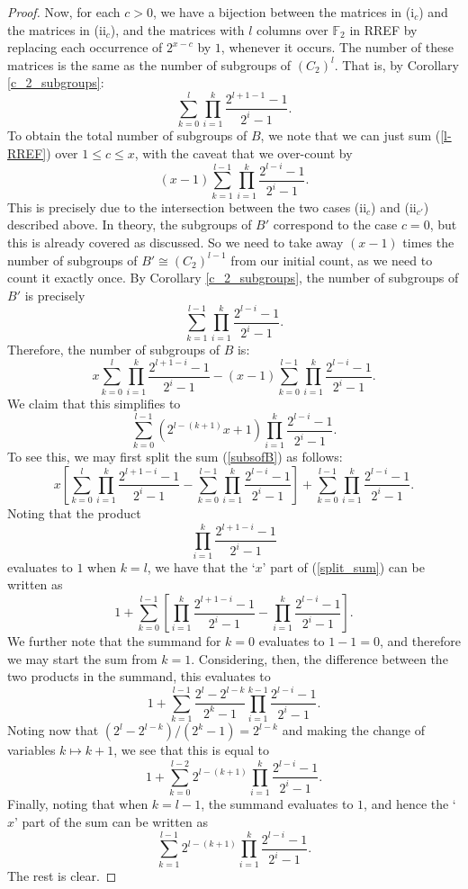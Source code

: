 \documentclass[10pt,a4paper]{amsart}
\begin{document}
\begin{proof}
    Now, for each $c>0$, we have a bijection between the matrices in (i$_c$) and the matrices in (ii$_c$), and the matrices with $l$ columns over $\mathbb{F}_2$ in RREF by replacing each occurrence of $2^{x-c}$ by $1$, whenever it occurs. The number of these matrices is the same as the number of subgroups of $(C_2)^l$. That is, by Corollary \ref{c_2_subgroups}:
    \begin{equation}\label{l-RREF}
        \sum_{k=0}^l\prod_{i=1}^k\frac{2^{l+1-1}-1}{2^i-1}.
    \end{equation}
    To obtain the total number of subgroups of $B$, we note that we can just sum (\ref{l-RREF}) over $1 \leq c \leq x$, with the caveat that we over-count by
    \[(x-1)\sum_{k=1}^{l-1}\prod_{i=1}^k\frac{2^{l-i}-1}{2^i-1}.\]
    This is precisely due to the intersection between the two cases (ii$_c$) and (ii$_{c'}$) described above. In theory, the subgroups of $B'$ correspond to the case $c=0$, but this is already covered as discussed. So we need to take away $(x-1)$ times the number of subgroups of $B' \cong (C_2)^{l-1}$ from our initial count, as we need to count it exactly once. By Corollary \ref{c_2_subgroups}, the number of subgroups of $B'$ is precisely
    \[\sum_{k=1}^{l-1}\prod_{i=1}^k\frac{2^{l-i}-1}{2^i-1}.\]
    Therefore, the number of subgroups of $B$ is:
    \begin{equation}\label{subsofB}
        x\sum_{k=0}^l\prod_{i=1}^k\frac{2^{l+1-i}-1}{2^i-1}-(x-1)\sum_{k=0}^{l-1}\prod_{i=1}^k\frac{2^{l-i}-1}{2^i-1}.
    \end{equation}
    We claim that this simplifies to
    \[\sum_{k=0}^{l-1}(2^{l-(k+1)}x+1)\prod_{i=1}^k\frac{2^{l-i}-1}{2^i-1}.\]
    To see this, we may first split the sum (\ref{subsofB}) as follows:
    \begin{equation}\label{split_sum}
        x\left[\sum_{k=0}^l\prod_{i=1}^k\frac{2^{l+1-i}-1}{2^i-1}-\sum_{k=0}^{l-1}\prod_{i=1}^k\frac{2^{l-i}-1}{2^i-1}\right]+\sum_{k=0}^{l-1}\prod_{i=1}^k\frac{2^{l-i}-1}{2^i-1}.
    \end{equation}
    Noting that the product
    \[\prod_{i=1}^k\frac{2^{l+1-i}-1}{2^i-1}\]
    evaluates to $1$ when $k=l$, we have that the `$x$' part of (\ref{split_sum}) can be written as
    \[1+\sum_{k=0}^{l-1}\left[\prod_{i=1}^k\frac{2^{l+1-i}-1}{2^i-1}-\prod_{i=1}^k\frac{2^{l-i}-1}{2^i-1}\right].\]
    We further note that the summand for $k=0$ evaluates to $1-1=0$, and therefore we may start the sum from $k=1$. Considering, then, the difference between the two products in the summand, this evaluates to
    \[1+\sum_{k=1}^{l-1}\frac{2^l-2^{l-k}}{2^k-1}\prod_{i=1}^{k-1}\frac{2^{l-i}-1}{2^i-1}.\]
    Noting now that $(2^l-2^{l-k})/(2^k-1)=2^{l-k}$ and making the change of variables $k \mapsto k+1$, we see that this is equal to
    \[1+\sum_{k=0}^{l-2}2^{l-(k+1)}\prod_{i=1}^k\frac{2^{l-i}-1}{2^i-1}.\]
    Finally, noting that when $k=l-1$, the summand evaluates to $1$, and hence the `$x$' part of the sum can be written as
    \[\sum_{k=1}^{l-1}2^{l-(k+1)}\prod_{i=1}^k\frac{2^{l-i}-1}{2^i-1}.\]
    The rest is clear.
\end{proof}
\end{document}

